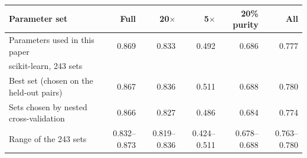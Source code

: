 \begin{tabular}{lrrrrr}
\toprule
Parameter set & Full & 20$\times$ & 5$\times$ & 20\% purity & All \\
\midrule
Parameters used in this paper & 0.869 & 0.833 & 0.492 & 0.686 & 0.777 \\
\midrule
\multicolumn{6}{l}{scikit-learn, 243 sets} \\
\quad Best set (chosen on the held-out pairs) & 0.867 & 0.836 & 0.511 & 0.688 & 0.780 \\
\quad Sets chosen by nested cross-validation & 0.866 & 0.827 & 0.486 & 0.684 & 0.774 \\
\quad Range of the 243 sets & 0.832--0.873 & 0.819--0.836 & 0.424--0.511 & 0.678--0.688 & 0.763--0.780 \\
\bottomrule
\end{tabular}

